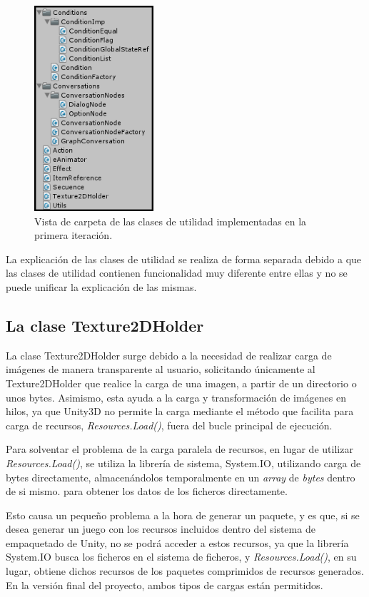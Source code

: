 \begin{figure}[htb]
	\centerline{\includegraphics[height=3in]{figures/it1/utilclasses.png}}
	\caption[Clases de Utilidad - Prototipo 1]{Vista de carpeta de las clases de utilidad implementadas en la primera iteración.}
	\label{utilclassesit1}
\end{figure}


La explicación de las clases de utilidad se realiza de forma separada debido a que las clases de utilidad contienen funcionalidad muy diferente entre ellas y no se puede unificar la explicación de las mismas.

\subsection{La clase Texture2DHolder}

La clase Texture2DHolder surge debido a la necesidad de realizar carga de imágenes de manera transparente al usuario, solicitando únicamente al Texture2DHolder que realice la carga de una imagen, a partir de un directorio o unos bytes. Asimismo, esta ayuda a la carga y transformación de imágenes en hilos, ya que Unity3D no permite la carga mediante el método que facilita para carga de recursos, \textit{Resources.Load()}, fuera del bucle principal de ejecución.

Para solventar el problema de la carga paralela de recursos, en lugar de utilizar \textit{Resources.Load()}, se utiliza la librería de sistema, System.IO, utilizando carga de bytes directamente, almacenándolos temporalmente en un \textit{array} de \textit{bytes} dentro de si mismo. para obtener los datos de los ficheros directamente.

Esto causa un pequeño problema a la hora de generar un paquete, y es que, si se desea generar un juego con los recursos incluidos dentro del sistema de empaquetado de Unity, no se podrá acceder a estos recursos, ya que la librería System.IO busca los ficheros en el sistema de ficheros, y \textit{Resources.Load()}, en su lugar, obtiene dichos recursos de los paquetes comprimidos de recursos generados. En la versión final del proyecto, ambos tipos de cargas están permitidos.

